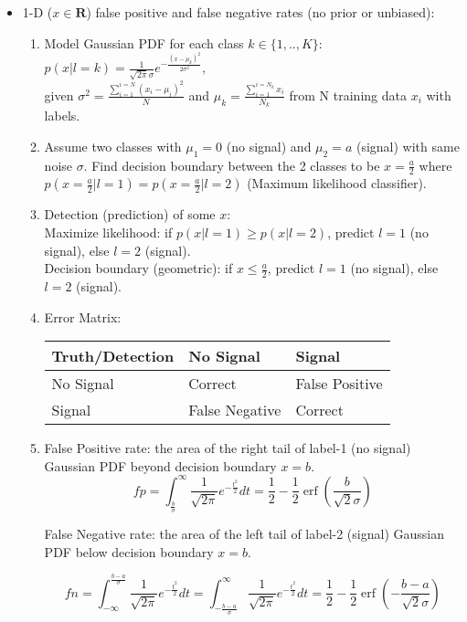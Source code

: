 \documentclass[11pt]{article}
\DeclareMathOperator{\erf}{erf}
\begin{document}
\begin{itemize}
    \item 1-D ($x \in \mathbf{R}$) false positive and false negative rates (no prior or unbiased):
\begin{enumerate}
    \item Model Gaussian PDF for each class $k \in \{1,..,K\}$:
    $p(x|l=k) = \frac{1}{\sqrt{2\pi}\sigma} e^{-\frac{{(x-\mu_k)}^2}{2\sigma^2}}$,\\
    given $\sigma^2=\frac{\sum_{i=1}^{i=N} {(x_i-\mu_i)}^2}{N}$ and $\mu_k = \frac{\sum_{i=1}^{i=N_k} x_i}{N_k}$ from N training data $x_i$ with labels. 
    \item Assume two classes with $\mu_1 = 0$ (no signal) and $\mu_2 = a$ (signal) with same noise $\sigma$. Find decision boundary between the 2 classes to be $x=\frac{a}{2}$ where $p(x=\frac{a}{2}|l=1) = p(x=\frac{a}{2}|l=2)$ (Maximum likelihood classifier).
    \item Detection (prediction) of some $x$: \\
    Maximize likelihood: if $p(x|l=1) \ge p(x|l=2)$, predict $l=1$ (no signal), else $l=2$ (signal).\\
    Decision boundary (geometric): if $x \leq \frac{a}{2}$, predict $l=1$ (no signal), else $l=2$ (signal).
    \item Error Matrix:
    
    \begin{tabular}{l|l|l}
    Truth/Detection&No Signal&Signal\\\hline
    No Signal&Correct&False Positive\\\hline
    Signal&False Negative&Correct\\
    \end{tabular}
    \item False Positive rate: the area of the right tail of label-1 (no signal) Gaussian PDF beyond decision boundary $x=b$.
    \begin{equation}
        fp = \int_{\frac{b}{\sigma}}^{\infty} \frac{1}{\sqrt{2\pi}} e^{-\frac{t^2}{2}}dt = \frac{1}{2} - \frac{1}{2} \erf(\frac{b}{\sqrt{2}\sigma})
    \end{equation}
    
    False Negative rate: the area of the left tail of label-2 (signal) Gaussian PDF below decision boundary $x=b$.
    
    \begin{equation}
        fn = \int_{-\infty}^{\frac{b-a}{\sigma}} \frac{1}{\sqrt{2\pi}} e^{-\frac{t^2}{2}}dt = \int_{-\frac{b-a}{\sigma}}^{\infty} \frac{1}{\sqrt{2\pi}} e^{-\frac{t^2}{2}}dt = \frac{1}{2} - \frac{1}{2} \erf(-\frac{b-a}{\sqrt{2}\sigma})
    \end{equation}
    

\end{enumerate}
\end{itemize}
\end{document}

